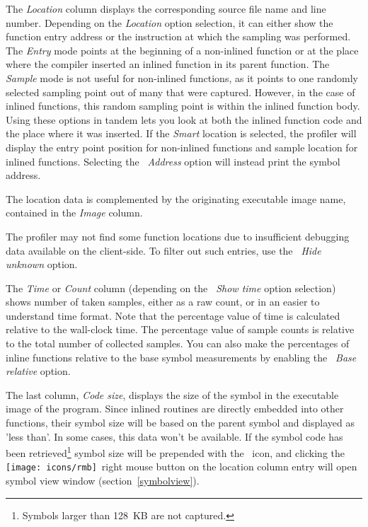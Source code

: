 \documentclass[hidelinks,titlepage,a4paper,twoside]{article}
\newcommand{\RMB}{\texttt{[image: icons/rmb]}}
\begin{document}
The \emph{Location} column displays the corresponding source file name and line number. Depending on the \emph{Location} option selection, it can either show the function entry address or the instruction at which the sampling was performed. The \emph{Entry} mode points at the beginning of a non-inlined function or at the place where the compiler inserted an inlined function in its parent function. The \emph{Sample} mode is not useful for non-inlined functions, as it points to one randomly selected sampling point out of many that were captured. However, in the case of inlined functions, this random sampling point is within the inlined function body. Using these options in tandem lets you look at both the inlined function code and the place where it was inserted. If the \emph{Smart} location is selected, the profiler will display the entry point position for non-inlined functions and sample location for inlined functions. Selecting the \emph{\faAt{}~Address} option will instead print the symbol address.

The location data is complemented by the originating executable image name, contained in the \emph{Image} column.

The profiler may not find some function locations due to insufficient debugging data available on the client-side. To filter out such entries, use the \emph{\faEyeSlash{}~Hide unknown} option.

The \emph{Time} or \emph{Count} column (depending on the \emph{\faStopwatch{}~Show time} option selection) shows number of taken samples, either as a raw count, or in an easier to understand time format. Note that the percentage value of time is calculated relative to the wall-clock time. The percentage value of sample counts is relative to the total number of collected samples. You can also make the percentages of inline functions relative to the base symbol measurements by enabling the \emph{\faLink{}~Base relative} option.

The last column, \emph{Code size}, displays the size of the symbol in the executable image of the program. Since inlined routines are directly embedded into other functions, their symbol size will be based on the parent symbol and displayed as 'less than'. In some cases, this data won't be available. If the symbol code has been retrieved\footnote{Symbols larger than 128~KB are not captured.} symbol size will be prepended with the \texttt{\faDatabase}~icon, and clicking the \RMB{}~right mouse button on the location column entry will open symbol view window (section~\ref{symbolview}).
\end{document}
